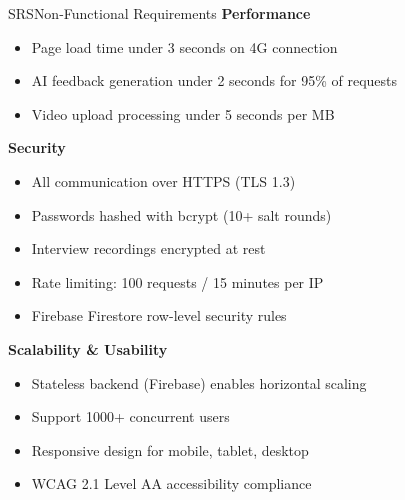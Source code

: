 \documentclass{beamer}
\begin{document}
\begin{frame}{SRS}{Non-Functional Requirements}
\textbf{Performance}
\begin{itemize}
    \item Page load time under 3 seconds on 4G connection
    \item AI feedback generation under 2 seconds for 95\% of requests
    \item Video upload processing under 5 seconds per MB
\end{itemize}

\vspace{3pt}

\textbf{Security}
\begin{itemize}
    \item All communication over HTTPS (TLS 1.3)
    \item Passwords hashed with bcrypt (10+ salt rounds)
    \item Interview recordings encrypted at rest
    \item Rate limiting: 100 requests / 15 minutes per IP
    \item Firebase Firestore row-level security rules
\end{itemize}

\vspace{3pt}

\textbf{Scalability \& Usability}
\begin{itemize}
    \item Stateless backend (Firebase) enables horizontal scaling
    \item Support 1000+ concurrent users
    \item Responsive design for mobile, tablet, desktop
    \item WCAG 2.1 Level AA accessibility compliance
\end{itemize}
\end{frame}

\end{document}
